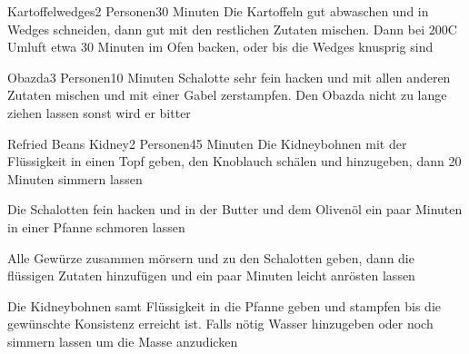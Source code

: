 
\begin{recipe}{Kartoffelwedges}{2 Personen}{30 Minuten}
Die Kartoffeln gut abwaschen und in Wedges schneiden, dann gut mit den restlichen Zutaten mischen. Dann bei 200\0C Umluft etwa 30 Minuten im Ofen backen, oder bis die Wedges knusprig sind
\end{recipe}


\begin{recipe}{Obazda}{3 Personen}{10 Minuten}
Schalotte sehr fein hacken und mit allen anderen Zutaten mischen und mit einer Gabel zerstampfen. Den Obazda nicht zu lange ziehen lassen sonst wird er bitter
\end{recipe}


\begin{recipe}{Refried Beans Kidney}{2 Personen}{45 Minuten}
Die Kidneybohnen mit der Flüssigkeit in einen Topf geben, den Knoblauch schälen und hinzugeben, dann 20 Minuten simmern lassen

Die Schalotten fein hacken und in der Butter und dem Olivenöl ein paar Minuten in einer Pfanne schmoren lassen

Alle Gewürze zusammen mörsern und zu den Schalotten geben, dann die flüssigen Zutaten hinzufügen und ein paar Minuten leicht anrösten lassen

\ing[]{}{}
Die Kidneybohnen samt Flüssigkeit in die Pfanne geben und stampfen bis die gewünschte Konsistenz erreicht ist. Falls nötig Wasser hinzugeben oder noch simmern lassen um die Masse anzudicken
\end{recipe}

